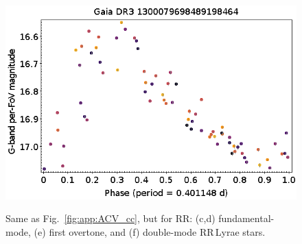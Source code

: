 \documentclass[longauth]{aa}
\begin{document}
\begin{appendix}
\begin{figure}
\hspace{2mm}
 \includegraphics[width=0.45\hsize]{figures/appendix/RRd-38.png} \\
\vspace{4mm}
 \caption{Same as Fig.~\ref{fig:app:ACV_cc}, but for RR:  (c,d) fundamental-mode, (e) first overtone, and (f) double-mode RR\,Lyrae stars.}
 \label{fig:app:RR_cc}
\end{figure}




\end{appendix}
\end{document}
